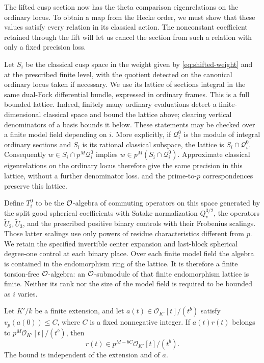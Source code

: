 The lifted cusp section now has the theta comparison eigenrelations
on the ordinary locus.  To obtain a map from the Hecke order, we must
show that these values satisfy every relation in its classical action.
The nonconstant coefficient retained through the lift will let us
cancel the section from such a relation with only a fixed precision
loss.

Let $S_i$ be the classical cusp space in the weight given by
\cref{eq:shifted-weight} and at the prescribed finite level, with
the quotient detected on the canonical ordinary locus taken if
necessary.  We use its lattice of sections integral in the same
dual-Fock differential bundle, expressed in ordinary frames.
This is a full bounded lattice.  Indeed,
finitely many ordinary evaluations detect a finite-dimensional
classical space and bound the lattice above; clearing vertical
denominators of a basis bounds it below.  These statements may be
checked over a finite model field depending on $i$.
More explicitly, if $\mathcal Q_i^0$ is the module of integral
ordinary sections and $S_i$ is its rational classical subspace,
the lattice is $S_i\cap\mathcal Q_i^0$.  Consequently
$w\in S_i\cap p^M\mathcal Q_i^0$ implies
$w\in p^M(S_i\cap\mathcal Q_i^0)$.  Approximate classical
eigenrelations on the ordinary locus therefore give the same
precision in this lattice, without a further denominator loss.
 and the prime-to-$p$ correspondences
preserve this lattice.

Define $T_i^0$ to be the $\mathcal O$-algebra of commuting operators on
this space generated by the split good spherical coefficients
with Satake normalization $Q_v^{3/2}$, the operators
$\widetilde U_2,\widetilde U_3$, and the prescribed positive
binary controls with their Frobenius scalings.  Those latter
scalings use only powers of residue characteristics different
from $p$.  We retain the specified invertible center expansion
and last-block spherical degree-one control at each binary
place.  Over each finite model field the algebra is contained in
the endomorphism ring of the lattice.  It is therefore a finite
torsion-free $\mathcal O$-algebra: an $\mathcal O$-submodule of that finite
endomorphism lattice is finite.  Neither its rank nor the size
of the model field is required to be bounded as $i$ varies.

\begin{lemma}
\label{lem:artin-content-cancellation}
Let $K'/k$ be a finite extension, and let
$a(t)\in\mathcal O_{K'}[t]/(t^b)$ satisfy
$v_p(a(0))\leq C$, where $C$ is a fixed nonnegative integer.
If $a(t)r(t)$ belongs to $p^M\mathcal O_{K'}[t]/(t^b)$, then
\[
       r(t)\in p^{M-bC}\mathcal O_{K'}[t]/(t^b).
\]
The bound is independent of the extension and of $a$.
\end{lemma}

